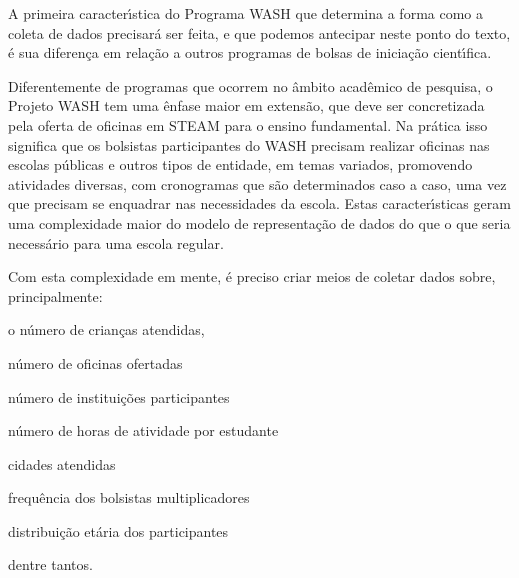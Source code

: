 \documentclass[
12pt,		%
openright,	%
twoside,  %
a4paper,			%
chapter=TITLE,		%
english,			%
french,				%
spanish,			%
brazil				%
]{USPSC-classe/USPSC_RedarTex}
\begin{document}
A primeira caracter\'{\i}stica do Programa WASH que determina a forma como a coleta de dados precisar\'a ser feita, e que podemos antecipar neste ponto do texto, \'e sua diferen\c{c}a em rela\c{c}\~ao a outros programas de bolsas de inicia\c{c}\~ao cient\'{\i}fica.










Diferentemente de programas que ocorrem no \^ambito acad\^emico de pesquisa, o Projeto WASH tem uma \^enfase maior em extens\~ao, que deve ser concretizada pela oferta de oficinas em STEAM para o ensino fundamental. Na pr\'atica isso significa que os bolsistas participantes do WASH precisam realizar oficinas nas escolas p\'ublicas e outros tipos de entidade, em temas variados, promovendo atividades diversas, com cronogramas que s\~ao determinados caso a caso, uma vez que precisam se enquadrar nas necessidades da escola. Estas caracter\'{\i}sticas geram uma complexidade maior do modelo de representa\c{c}\~ao de dados do que o que seria necess\'ario para uma escola regular.










Com esta complexidade em mente, \'e preciso criar meios de coletar dados sobre, principalmente:











\begin{alineas}
\item o n\'umero de crian\c{c}as atendidas,
\item n\'umero de oficinas ofertadas
\item n\'umero de institui\c{c}\~oes participantes
\item n\'umero de horas de atividade por estudante
\item cidades atendidas
\item frequ\^encia dos bolsistas multiplicadores
\item distribui\c{c}\~ao et\'aria dos participantes
\end{alineas}

dentre tantos.
\end{document}
